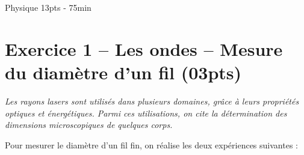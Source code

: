 \documentclass[12pt]{article}
\begin{document}



\newpage
\begin{center}
\hrulefill
\Large{Physique 13pts - 75min}
\hrulefill\\
\end{center}

\section*{Exercice 1 – Les ondes – Mesure du diamètre d’un fil \dotfill(03pts)}

\emph{Les rayons lasers sont utilisés dans plusieurs domaines, grâce à leurs propriétés
optiques et énergétiques. Parmi ces utilisations, on cite la détermination des
dimensions microscopiques de quelques corps.}

Pour mesurer le diamètre d’un fil fin, on réalise les deux expériences suivantes : 
\end{document}
